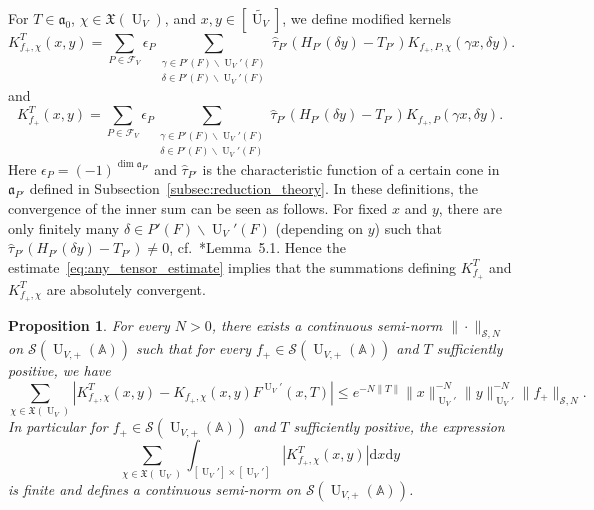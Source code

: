 \documentclass[letterpaper,11pt]{amsart}
\newcommand{\fa}{\mathfrak{a}}
\newcommand{\fX}{\mathfrak{X}}
\newcommand{\bA}{\mathbb{A}}
\newcommand{\cF}{\mathcal{F}}
\newcommand{\cS}{\mathcal{S}}
\newcommand{\rd}{\mathrm{d}}
\newcommand{\<}{\negthickspace}
\DeclareMathOperator{\U}{U}
\theoremstyle{definition}
\theoremstyle{plain}
\newtheorem{prop}[definition]{Proposition}
\theoremstyle{remark}
\numberwithin{equation}{section}
\begin{document}
For $T \in \fa_0$, $\chi \in \fX(\U_V)$, and $x, y \in [\widetilde{\U_V}]$, we
define modified kernels
    \[
    K_{f_+, \chi}^T(x,y)= \sum_{P \in {\cF_V}} \epsilon_P
    \sum_{\substack{\gamma \in P'(F) \backslash \U_V'(F)
    \\ \delta \in P'(F)
    \backslash \U_V'(F)}}
    \widehat{\tau}_{P'}(H_{P'}(\delta y)-T_{P'})
    K_{f_+,P, \chi}(\gamma x,\delta y).
    \]
and
    \[
    K_{f_+}^T(x,y) = \sum_{P \in {\cF_V}}
    \epsilon_P
    \sum_{\substack{\gamma \in P'(F) \backslash \U_V'(F)
    \\ \delta \in P'(F) \backslash \U_V'(F)}}
    \widehat{\tau}_{P'}(H_{P'}(\delta y)-T_{P'})
    K_{f_+, P}(\gamma x, \delta y).
    \]
Here $\epsilon_P = (-1)^{\dim \fa_{P'}}$ and $\widehat{\tau}_{P'}$ is the
characteristic function of a certain cone in $\fa_{P'}$ defined in
Subsection~\ref{subsec:reduction_theory}. In these definitions, the
convergence of the inner sum can be seen as follows. For fixed $x$ and $y$,
there are only finitely many $\delta \in P'(F) \backslash \U_V'(F)$ (depending
on $y$) such that $\widehat{\tau}_{P'}(H_{P'}(\delta y)-T_{P'}) \ne 0$,
cf.~\cite{Arthur3}*{Lemma~5.1}. Hence the
estimate~\eqref{eq:any_tensor_estimate} implies that the summations defining $K_{f_+}^T$ and
$K_{f_+,\chi}^T$ are absolutely convergent.







\begin{prop} \label{prop:u_asymptotic_modified_kernel}
For every $N>0$, there exists a continuous semi-norm $\| \cdot \|_{\cS,N}$ on
$\cS(\U_{V, +}(\bA))$ such that for every $f_+ \in \cS(\U_{V, +}(\bA))$ and
$T$ sufficiently positive, we have
    \begin{equation}    \label{eq:u_asymptotic_modified_kernel}
    \sum_{\chi \in \fX(\U_V)}
    \left| K_{f_+,\chi}^T(x,y)-K_{f_+,\chi}(x,y) F^{\U_V'}(x,T) \right|
    \le e^{-N\|T\|} \| x \|_{\U_V'}^{-N} \| y \|_{\U_V'}^{-N}
    \| f_+ \|_{\cS,N}.
    \end{equation}
In particular for $f_+ \in \cS(\U_{V,+}(\bA))$ and $T$ sufficiently positive, the
expression
    \[
    \sum_{\chi \in \fX(\U_V)} \int_{[\U_V'] \times [\U_V']}
    \left| K_{f_+,\chi}^T(x,y) \right| \rd x \rd y
    \]
is finite and defines a continuous semi-norm on $\cS(\U_{V,+}(\bA))$.
\end{prop}
\end{document}
